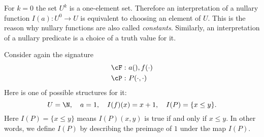 \begin{page}
\setcounter{section}{1}
\setcounter{subsection}{4}
\setcounter{dfn}{11}
\label{portion:595}


For $k=0$ the set $U^k$ is a one-element set.
Therefore an interpretation of a nullary function $I(a) \colon U^0 \to U$ is equivalent to choosing an element of $U$.
This is the reason why nullary functions are also called \emph{constants}.
Similarly, an interpretation of a nullary predicate is a choice of a truth value for it.


\end{page}

\begin{page}
\setcounter{section}{1}
\setcounter{subsection}{4}
\setcounter{dfn}{12}
\label{portion:597}

\begin{exl}
Consider again the signature
\begin{align*}
\cF:\ &a(), f(\cdot) \\
\cP:\ &P(\cdot, \cdot)
\end{align*}
Here is one of possible structures for it:
\[
U = \N, \quad a = 1, \quad I(f)(x) = x+1, \quad I(P) = \{x \le y\}.
\]
Here $I(P) = \{x \le y\}$ means $I(P)(x,y)$ is true if and only if $x \le y$.
In other words, we define $I(P)$ by describing the preimage of $1$ under the map $I(P)$.
\end{exl}

\end{page}

